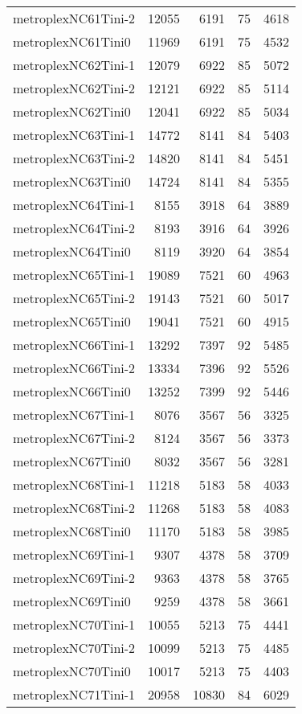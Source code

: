 \begin{longtable}{lrrrr}
metroplexNC61Tini-2 & 12055 & 6191 & 75 & 4618 \\
metroplexNC61Tini0 & 11969 & 6191 & 75 & 4532 \\
metroplexNC62Tini-1 & 12079 & 6922 & 85 & 5072 \\
metroplexNC62Tini-2 & 12121 & 6922 & 85 & 5114 \\
metroplexNC62Tini0 & 12041 & 6922 & 85 & 5034 \\
metroplexNC63Tini-1 & 14772 & 8141 & 84 & 5403 \\
metroplexNC63Tini-2 & 14820 & 8141 & 84 & 5451 \\
metroplexNC63Tini0 & 14724 & 8141 & 84 & 5355 \\
metroplexNC64Tini-1 & 8155 & 3918 & 64 & 3889 \\
metroplexNC64Tini-2 & 8193 & 3916 & 64 & 3926 \\
metroplexNC64Tini0 & 8119 & 3920 & 64 & 3854 \\
metroplexNC65Tini-1 & 19089 & 7521 & 60 & 4963 \\
metroplexNC65Tini-2 & 19143 & 7521 & 60 & 5017 \\
metroplexNC65Tini0 & 19041 & 7521 & 60 & 4915 \\
metroplexNC66Tini-1 & 13292 & 7397 & 92 & 5485 \\
metroplexNC66Tini-2 & 13334 & 7396 & 92 & 5526 \\
metroplexNC66Tini0 & 13252 & 7399 & 92 & 5446 \\
metroplexNC67Tini-1 & 8076 & 3567 & 56 & 3325 \\
metroplexNC67Tini-2 & 8124 & 3567 & 56 & 3373 \\
metroplexNC67Tini0 & 8032 & 3567 & 56 & 3281 \\
metroplexNC68Tini-1 & 11218 & 5183 & 58 & 4033 \\
metroplexNC68Tini-2 & 11268 & 5183 & 58 & 4083 \\
metroplexNC68Tini0 & 11170 & 5183 & 58 & 3985 \\
metroplexNC69Tini-1 & 9307 & 4378 & 58 & 3709 \\
metroplexNC69Tini-2 & 9363 & 4378 & 58 & 3765 \\
metroplexNC69Tini0 & 9259 & 4378 & 58 & 3661 \\
metroplexNC70Tini-1 & 10055 & 5213 & 75 & 4441 \\
metroplexNC70Tini-2 & 10099 & 5213 & 75 & 4485 \\
metroplexNC70Tini0 & 10017 & 5213 & 75 & 4403 \\
metroplexNC71Tini-1 & 20958 & 10830 & 84 & 6029 \\

\end{longtable}

